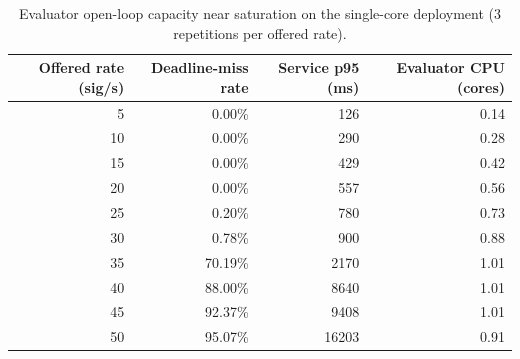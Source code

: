 \begin{table}[t]
\centering
\caption{Evaluator open-loop capacity near saturation on the single-core deployment (3 repetitions per offered rate).}
\label{tab:scal-evaluator}
\begin{tabular}{rrrr}
\toprule
Offered rate (sig/s) & Deadline-miss rate & Service p95 (ms) & Evaluator CPU (cores) \\
\midrule
5 & 0.00\% & 126 & 0.14 \\
10 & 0.00\% & 290 & 0.28 \\
15 & 0.00\% & 429 & 0.42 \\
20 & 0.00\% & 557 & 0.56 \\
25 & 0.20\% & 780 & 0.73 \\
30 & 0.78\% & 900 & 0.88 \\
35 & 70.19\% & 2170 & 1.01 \\
40 & 88.00\% & 8640 & 1.01 \\
45 & 92.37\% & 9408 & 1.01 \\
50 & 95.07\% & 16203 & 0.91 \\
\bottomrule
\end{tabular}
\end{table}

